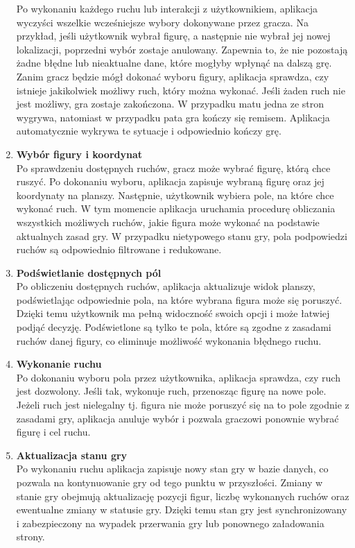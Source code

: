 \documentclass[12pt,a4paper]{article}
\begin{document}
\begin{enumerate}
    Po wykonaniu każdego ruchu lub interakcji z użytkownikiem, aplikacja wyczyści wszelkie wcześniejsze wybory dokonywane przez gracza. Na przykład, jeśli użytkownik wybrał figurę, a następnie nie wybrał jej nowej lokalizacji, poprzedni wybór zostaje anulowany. Zapewnia to, że nie pozostają żadne błędne lub nieaktualne dane, które mogłyby wpłynąć na dalszą grę. Zanim gracz będzie mógł dokonać wyboru figury, aplikacja sprawdza, czy istnieje jakikolwiek możliwy ruch, który można wykonać. Jeśli żaden ruch nie jest możliwy, gra zostaje zakończona. W przypadku matu jedna ze stron wygrywa, natomiast w przypadku pata gra kończy się remisem. Aplikacja automatycznie wykrywa te sytuacje i odpowiednio kończy grę.
    \item \textbf{Wybór figury i koordynat}\\
    Po sprawdzeniu dostępnych ruchów, gracz może wybrać figurę, którą chce ruszyć. Po dokonaniu wyboru, aplikacja zapisuje wybraną figurę oraz jej koordynaty na planszy. Następnie, użytkownik wybiera pole, na które chce wykonać ruch. W tym momencie aplikacja uruchamia procedurę obliczania wszystkich możliwych ruchów, jakie figura może wykonać na podstawie aktualnych zasad gry. W przypadku nietypowego stanu gry,  pola podpowiedzi ruchów są odpowiednio filtrowane i redukowane.
    \item \textbf{Podświetlanie dostępnych pól}\\
    Po obliczeniu dostępnych ruchów, aplikacja aktualizuje widok planszy, podświetlając odpowiednie pola, na które wybrana figura może się poruszyć. Dzięki temu użytkownik ma pełną widoczność swoich opcji i może łatwiej podjąć decyzję. Podświetlone są tylko te pola, które są zgodne z zasadami ruchów danej figury, co eliminuje możliwość wykonania błędnego ruchu.
    \item \textbf{Wykonanie ruchu}\\
    Po dokonaniu wyboru pola przez użytkownika, aplikacja sprawdza, czy ruch jest dozwolony. Jeśli tak, wykonuje ruch, przenosząc figurę na nowe pole. Jeżeli ruch jest nielegalny tj. figura nie może poruszyć się na to pole zgodnie z zasadami gry, aplikacja anuluje wybór i pozwala graczowi ponownie wybrać figurę i cel ruchu.
    \item \textbf{Aktualizacja stanu gry}\\
    Po wykonaniu ruchu aplikacja zapisuje nowy stan gry w bazie danych, co pozwala na kontynuowanie gry od tego punktu w przyszłości. Zmiany w stanie gry obejmują aktualizację pozycji figur, liczbę wykonanych ruchów oraz ewentualne zmiany w statusie gry. Dzięki temu stan gry jest synchronizowany i zabezpieczony na wypadek przerwania gry lub ponownego załadowania strony.

\end{enumerate}
\end{document}
